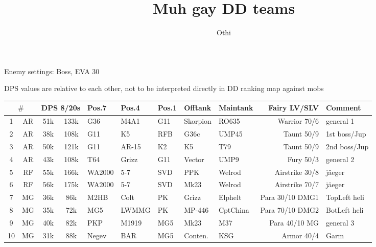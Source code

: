 \documentclass[]{article}
\title{Muh gay DD teams}
\author{Othi}
\date{}
\begin{document}
\maketitle


\newcommand{\inlinecode}{\texttt}

Enemy settings: Boss, EVA 30

DPS values are relative to each other, not to be interpreted directly in
DD ranking map against mobs

\hspace*{-1cm}\begin{tabular}{| c || c || c | c ||
l | l | l | l | l ||
r || l |}
\hline
\multicolumn{2}{|c||}{$\#$} &
\multicolumn{2}{|c||}{DPS 8/20s} &            Pos.7  & Pos.4 & Pos.1 & Offtank  & Maintank & Fairy LV/SLV    & Comment      \\ \hline \hline
1  & \cellcolor{light-green}AR & 51k & 133k & G36    & M4A1  & G11   & Skorpion & RO635    & Warrior 70/6    & general 1    \\ \hline
2  & \cellcolor{light-red}AR   & 38k & 108k & G11    & K5    & RFB   & G36c     & UMP45    & Taunt 50/9      & 1st boss/Jup \\ \hline
3  & \cellcolor{light-red}AR   & 50k & 121k & G11    & AR-15 & K2    & K5       & T79      & Taunt 50/9      & 2nd boss/Jup \\ \hline
4  & \cellcolor{light-green}AR & 43k & 108k & T64    & Grizz & G11   & Vector   & UMP9     & Fury 50/3       & general 2    \\ \hline
5  & \cellcolor{orange}RF      & 55k & 166k & WA2000 & 5-7   & SVD   & PPK      & Welrod   & Airstrike 30/8  & jäeger       \\ \hline
6  & \cellcolor{orange}RF      & 56k & 175k & WA2000 & 5-7   & SVD   & Mk23     & Welrod   & Airstrike 70/7  & jäeger       \\ \hline
7  & \cellcolor{lavender}MG    & 36k & 86k  & M2HB   & Colt  & PK    & Grizz    & Elphelt  & Para 30/10 DMG1 & TopLeft heli \\ \hline
8  & \cellcolor{lavender}MG    & 35k & 72k  & MG5    & LWMMG & PK    & MP-446   & CptChina & Para 70/10 DMG2 & BotLeft heli \\ \hline
9  & \cellcolor{lavender}MG    & 40k & 82k  & PKP    & M1919 & MG5   & Mk23     & M37      & Para 40/10 MG   & general 3    \\ \hline
10 & \cellcolor{light-gray}MG  & 31k & 88k  & Negev  & BAR   & MG5   & Conten.  & KSG      & Armor 40/4      & Garm         \\ \hline
\end{tabular}
\hspace*{-1cm}
\end{document}

